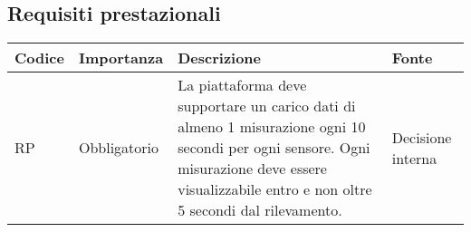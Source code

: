 \subsection{Requisiti prestazionali}
\setcounter{rowcounter}{0}
\begin{longtable}{|C{1.5cm}|C{2cm}|L{5cm}|C{2cm}|}
    \hline
    \textbf{Codice} & \textbf{Importanza} & \textbf{Descrizione} & \textbf{Fonte}  \\

  
    \hline
     RP & Obbligatorio & La piattaforma deve supportare un carico dati di almeno 1 misurazione ogni 10 secondi per ogni sensore. Ogni misurazione deve essere visualizzabile entro e non oltre 5 secondi dal rilevamento. & Decisione interna \\
   
    \hline
\end{longtable}
